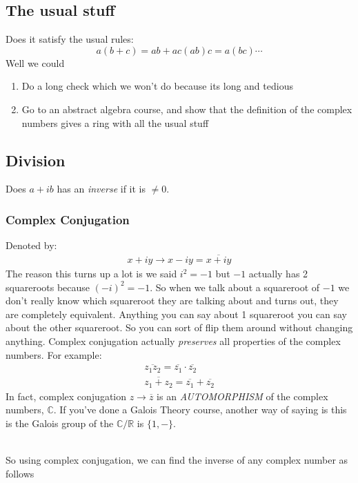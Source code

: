 \documentclass{article}
\begin{document}
\subsection{The usual stuff}
Does it satisfy the usual rules:
\begin{equation}
	a(b+c) = ab+ac
	(ab)c = a(bc)
	\cdots
\end{equation}
Well we could
\begin{enumerate}
	\item Do a long check which we won't do because its long and tedious
	\item Go to an abstract algebra course, and show that the definition of the complex numbers gives a ring
	      with all the usual stuff
\end{enumerate}
\subsection{Division}
Does $a+ib$ has an \textit{inverse} if it is $\neq 0$.

\subsubsection{Complex Conjugation}
Denoted by:
\begin{gather*}
	x + iy \rightarrow x - iy = \overline{x+iy}
\end{gather*}
The reason this turns up a lot is we said $i^{2} = -1$ but $-1$
actually has 2 squareroots because $(-i)^{2} = -1$. So when we talk about
a squareroot of $-1$ we don't really know which squareroot they
are talking about and turns out, they are completely equivalent. Anything
you can say about 1 squareroot you can say about the other squareroot.
So you can sort of flip them around without changing anything. Complex
conjugation actually \textit{preserves} all properties of the complex
numbers. For example:
\begin{gather}
	\overline{z_{1}z_{2}} = \overline{z_1} \cdot \overline{z_2} \\
	\overline{z_{1}+z_{2}} = \overline{z_1} + \overline{z_2}
\end{gather}
In fact, complex conjugation $z \rightarrow \overline{z}$ is an \textit{AUTOMORPHISM}
of the complex numbers, $\mathbb{C}$. If you've done a Galois Theory course, another way
of saying is this is the Galois group of the $\mathbb{C}/\mathbb{R}$ is $\{1,-\}$.

\noindent \\ So using complex conjugation, we can find the inverse of any
complex number as follows
\end{document}
